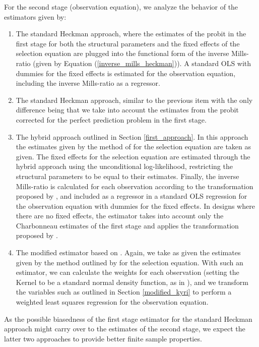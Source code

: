 For the second stage (observation equation), we analyze the behavior of the estimators given by:
\renewcommand{\theenumi}{\roman{enumi}}%
\begin{enumerate}
  \item The standard Heckman approach, where the estimates of the probit in the first stage for both the structural parameters and the fixed effects of the selection equation are plugged into the functional form of the inverse Mills-ratio (given by Equation (\ref{inverse_mills_heckman})). A standard OLS with dummies for the fixed effects is estimated for the observation equation, including the inverse Mills-ratio as a regressor.
  \item  The standard Heckman approach, similar to the previous item with the only difference being that we take into account the estimates from the probit corrected for the perfect prediction problem in the first stage.
  \item The hybrid approach outlined in Section \ref{first_approach}. In this approach the estimates given by the method of \cite{charbonneau2017multiple} for the selection equation are taken as given. The fixed effects for the selection equation are estimated through the hybrid approach using the unconditional log-likelihood, restricting the structural parameters to be equal to their estimates. Finally, the inverse Mills-ratio is calculated for each observation according to the transformation proposed by \cite{lee1983generalized}, and included as a regressor in a standard OLS regression for the observation equation with dummies for the fixed effects. In designs where there are no fixed effects, the estimator takes into account only the Charbonneau estimates of the first stage and applies the transformation proposed by \cite{lee1983generalized}.
  \item The modified estimator based on \cite{kyriazidou1997estimation}. Again, we take as given the estimates given by the method outlined by \cite{charbonneau2017multiple} for the selection equation. With such an estimator, we can calculate the weights for each observation (setting the Kernel to be a standard normal density function, as in \cite{kyriazidou1997estimation}), and we transform the variables such as outlined in Section \ref{modified_kyri} to perform a weighted least squares regression for the observation equation.
\end{enumerate}

As the possible biasedness of the first stage estimator for the standard Heckman approach might carry over to the estimates of the second stage, we expect the latter two approaches to provide better finite sample properties.

